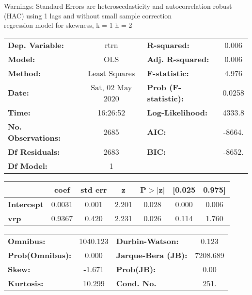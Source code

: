 Warnings: \newline
 [1] Standard Errors are heteroscedasticity and autocorrelation robust (HAC) using 1 lags and without small sample correction\\ 

regression model for skewness, k = 1 h = 2\begin{center}
\begin{tabular}{lclc}
\toprule
\textbf{Dep. Variable:}    &       rtrn       & \textbf{  R-squared:         } &     0.006   \\
\textbf{Model:}            &       OLS        & \textbf{  Adj. R-squared:    } &     0.006   \\
\textbf{Method:}           &  Least Squares   & \textbf{  F-statistic:       } &     4.976   \\
\textbf{Date:}             & Sat, 02 May 2020 & \textbf{  Prob (F-statistic):} &   0.0258    \\
\textbf{Time:}             &     16:26:52     & \textbf{  Log-Likelihood:    } &    4333.8   \\
\textbf{No. Observations:} &        2685      & \textbf{  AIC:               } &    -8664.   \\
\textbf{Df Residuals:}     &        2683      & \textbf{  BIC:               } &    -8652.   \\
\textbf{Df Model:}         &           1      & \textbf{                     } &             \\
\bottomrule
\end{tabular}
\begin{tabular}{lcccccc}
                   & \textbf{coef} & \textbf{std err} & \textbf{z} & \textbf{P$> |$z$|$} & \textbf{[0.025} & \textbf{0.975]}  \\
\midrule
\textbf{Intercept} &       0.0031  &        0.001     &     2.201  &         0.028        &        0.000    &        0.006     \\
\textbf{vrp}       &       0.9367  &        0.420     &     2.231  &         0.026        &        0.114    &        1.760     \\
\bottomrule
\end{tabular}
\begin{tabular}{lclc}
\textbf{Omnibus:}       & 1040.123 & \textbf{  Durbin-Watson:     } &    0.123  \\
\textbf{Prob(Omnibus):} &   0.000  & \textbf{  Jarque-Bera (JB):  } & 7208.689  \\
\textbf{Skew:}          &  -1.671  & \textbf{  Prob(JB):          } &     0.00  \\
\textbf{Kurtosis:}      &  10.299  & \textbf{  Cond. No.          } &     251.  \\
\bottomrule
\end{tabular}
\end{center}

